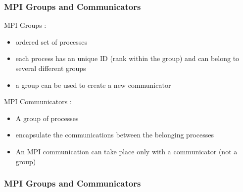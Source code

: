\begin{frame}[containsverbatim]
\frametitle{MPI Groups and Communicators}	
MPI Groups :
\begin{itemize}
	\item {ordered set of processes}
	\item {each process has an unique ID (rank within the group) and can belong to several different groups}
	\item {a group can be used to create a new communicator}
\end{itemize}
MPI Communicators :
\begin{itemize}
	\item {A group of processes}
	\item {encapsulate the communications between the belonging processes}
	\item {An MPI communication can take place only with a communicator (not a group)}
\end{itemize}
\end{frame}


\begin{frame}[containsverbatim]
\frametitle{MPI Groups and Communicators}	
\begin{center}

\end{center}
\end{frame}



